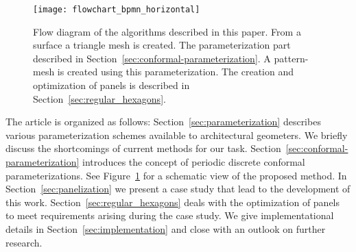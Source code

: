 \documentclass[article.tex]{subfiles}
\begin{document}
\begin{figure}[bt]
\centering
\texttt{[image: flowchart\_bpmn\_horizontal]}
\caption{Flow diagram of the algorithms described in this paper. From
  a \nurbs surface a triangle mesh is created. The parameterization
  part described in Section~\ref{sec:conformal-parameterization}. A
  pattern-mesh is created using this parameterization. The creation
  and optimization of panels is described in
  Section~\ref{sec:regular_hexagons}.}
\label{fig:algorithm_diagram}
\end{figure}

The article is organized as follows:
Section~\ref{sec:parameterization} describes various parameterization
schemes available to architectural geometers. We briefly discuss the
shortcomings of current methods for our task.
Section~\ref{sec:conformal-parameterization} introduces the concept of
periodic discrete conformal parameterizations.  See
Figure~\ref{fig:algorithm_diagram} for a schematic view of the
proposed method. In Section~\ref{sec:panelization} we present a case
study that lead to the development of this
work. Section~\ref{sec:regular_hexagons} deals with the optimization
of panels to meet requirements arising during the case study. We give
implementational details in Section~\ref{sec:implementation} and close
with an outlook on further research.


\subfilebibliography
\end{document}
